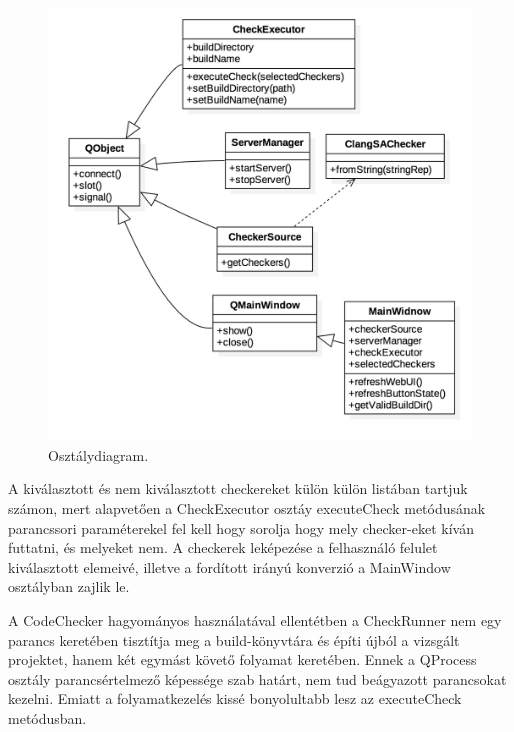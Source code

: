 \documentclass[a4paper,12pt]{report}
\begin{document}
\begin{figure}[h]
\caption{Osztálydiagram.}
\centering
\includegraphics[scale=0.3]{osztalydiagram.png}
\end{figure}

A kiválasztott és nem kiválasztott checkereket külön külön listában tartjuk számon, mert alapvetően a CheckExecutor osztáy executeCheck metódusának parancssori paraméterekel fel kell hogy sorolja hogy mely checker-eket kíván futtatni, és melyeket nem. A checkerek leképezése a felhasználó felulet kiválasztott elemeivé, illetve a fordított irányú konverzió a MainWindow osztályban zajlik le.

A CodeChecker hagyományos használatával ellentétben a CheckRunner nem egy parancs keretében tisztítja meg a build-könyvtára és építi újból a vizsgált projektet, hanem két egymást követő folyamat keretében. Ennek a QProcess osztály parancsértelmező képessége szab határt, nem tud beágyazott parancsokat kezelni. Emiatt a folyamatkezelés kissé bonyolultabb lesz az executeCheck metódusban.
\end{document}
